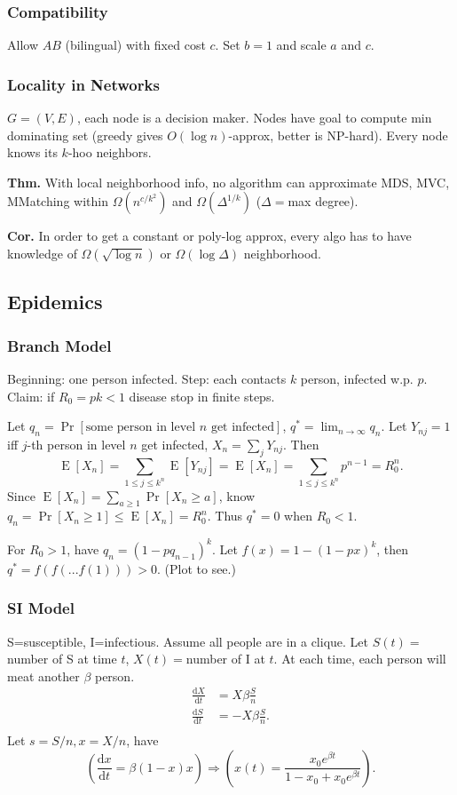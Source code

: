 \documentclass[a4paper,twocolumn,10pt]{article}
\newcommand{\pte}[1]{\left({#1}\right)}
\newcommand{\E}{\operatorname{E}}
\newcommand{\dd}{\mathrm{d}}
\begin{document}
	\subsubsection{Compatibility}
		Allow $AB$ (bilingual) with fixed cost $c$.
		Set $b=1$ and scale $a$ and $c$.
	
	\subsubsection{Locality in Networks}
		$G=(V,E)$, each node is a decision maker.
		Nodes have goal to compute min dominating set (greedy gives $O(\log n)$-approx,
			better is NP-hard).
		Every node knows its $k$-hoo neighbors.

		\textbf{Thm.}
		With local neighborhood info, no algorithm can approximate
			MDS, MVC, MMatching within $\Omega(n^{c/k^2})$ and $\Omega(\Delta^{1/k})$
			($\Delta=$max degree).

		\textbf{Cor.}
		In order to get a constant or poly-log approx, every algo has to  have knowledge
			of $\Omega(\sqrt{\log n})$ or $\Omega(\log \Delta)$ neighborhood.

\subsection{Epidemics}
	\subsubsection{Branch Model}
		Beginning: one person infected.
		Step: each contacts $k$ person, infected w.p. $p$.
		Claim: if $R_0=pk<1$ disease stop in finite steps.
		
		Let $q_n=\Pr[\textrm{some person in level $n$ get infected}]$,
		$q^*=\lim_{n\to\infty} q_n$.
		Let $Y_{nj}=1$ iff $j$-th person in level $n$ get infected,
			$X_n=\sum_j Y_{nj}$.
		Then 
		\[
			\E[X_n]=\sum_{1\le j\le k^{n}} \E[Y_{nj}]=
			\E[X_n]=\sum_{1\le j\le k^{n}} p^{n-1} = R_0^{n}.
		\]
		Since $\E[X_n]=\sum_{a\ge 1} \Pr[X_n\ge a]$,
			know $q_n=\Pr[X_n\ge 1]\le \E[X_n]=R_0^n$.
		Thus $q^*=0$ when $R_0<1$.
		
		For $R_0>1$, have $q_n=(1-p q_{n-1})^k$.
		Let $f(x)=1-(1-px)^k$, then $q^*=f(f(...f(1)))>0$. (Plot to see.)
	
	\subsubsection{SI Model}
		S=susceptible, I=infectious.
		Assume all people are in a clique.
		Let $S(t)=$number of S at time $t$, $X(t)=$number of I at $t$.
		At each time, each person will meat another $\beta$ person.
		\[ \begin{split}
			\frac{\dd X}{\dd t} &= X \beta \frac{S}{n} \\
			\frac{\dd S}{\dd t} &= -X \beta \frac{S}{n}. \\
		\end{split} \]
		Let $s=S/n,x=X/n$, have
		\[
			\pte{\frac{\dd x}{\dd t} = \beta(1-x)x}
			\Longrightarrow
			\pte{x(t)=\frac{x_0 e^{\beta t}}{1-x_0+x_0 e^{\beta t}}}.
		\]
	
\end{document}
